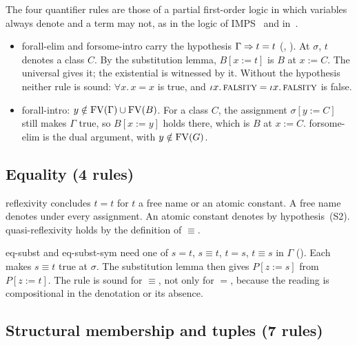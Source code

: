The four quantifier rules are those of a partial first-order logic in
which variables always denote and a term may not, as in the logic of
IMPS~\cite{IMPS} and in~\cite{Farmer2023}.
\begin{itemize}
\item forall-elim and forsome-intro carry the hypothesis $\Gamma\Rightarrow t=t$
  (, ).  At $\sigma$, $t$ denotes a class $C$.  By the
  substitution lemma, $B[x:=t]$ is $B$ at $x:=C$.  The universal gives
  it; the existential is witnessed by it.  Without the hypothesis
  neither rule is sound: $\forall x.\,x=x$ is true, and
  $\iota x.\,\textsc{falsity} = \iota x.\,\textsc{falsity}$ is false.
\item forall-intro: $y\notin\mathrm{FV}(\Gamma)\cup\mathrm{FV}(B)$.  For a class $C$,
  the assignment $\sigma[y:=C]$ still makes $\Gamma$ true, so $B[x:=y]$
  holds there, which is $B$ at $x:=C$.  forsome-elim is the dual
  argument, with $y\notin\mathrm{FV}(G)$.
\end{itemize}

\subsection{Equality (4 rules)}

reflexivity concludes $t=t$ for $t$ a free name or an atomic constant.
A free name denotes under every assignment.  An atomic constant denotes
by hypothesis~(S2).  quasi-reflexivity holds by the definition of
$\equiv$.

eq-subst and eq-subst-sym need one of $s=t$, $s\equiv t$, $t=s$,
$t\equiv s$ in $\Gamma$ ().  Each makes $s\equiv t$ true at
$\sigma$.  The substitution lemma then gives $P[z:=s]$ from $P[z:=t]$.
The rule is sound for $\equiv$, not only for $=$, because the reading
is compositional in the denotation or its absence.

\subsection{Structural membership and tuples (7 rules)}

